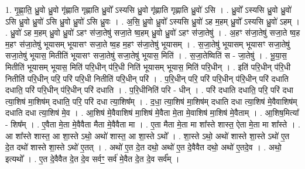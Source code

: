 \documentclass[17pt]{extarticle}
\begin{document}
1. गृ॒ह्णा॒ति॒ ध्रु॒वो ध्रु॒वो गृ॑ह्णाति गृह्णाति ध्रु॒वो᳚ ऽस्यसि ध्रु॒वो गृ॑ह्णाति गृह्णाति ध्रु॒वो॑ ऽसि । . ध्रु॒वो᳚ ऽस्यसि ध्रु॒वो ध्रु॒वो॑ ऽसि ध्रु॒वो ध्रु॒वो॑ ऽसि ध्रु॒वो ध्रु॒वो॑ ऽसि ध्रु॒वः । . अ॒सि॒ ध्रु॒वो ध्रु॒वो᳚ ऽस्यसि ध्रु॒वो॑ ऽह म॒हम् ध्रु॒वो᳚ ऽस्यसि ध्रु॒वो॑ ऽहम् । . ध्रु॒वो॑ ऽह म॒हम् ध्रु॒वो ध्रु॒वो॑ ऽहꣳ स॑जा॒तेषु॑ सजा॒ते ष्व॒हम् ध्रु॒वो ध्रु॒वो॑ ऽहꣳ स॑जा॒तेषु॑ । . अ॒हꣳ स॑जा॒तेषु॑ सजा॒ते ष्व॒ह म॒हꣳ स॑जा॒तेषु॑ भूयासम् भूयासꣳ सजा॒ते ष्व॒ह म॒हꣳ स॑जा॒तेषु॑ भूयासम् । . स॒जा॒तेषु॑ भूयासम् भूयासꣳ सजा॒तेषु॑ सजा॒तेषु॑ भूयास॒ मितीति॑ भूयासꣳ सजा॒तेषु॑ सजा॒तेषु॑ भूयास॒ मिति॑ । . स॒जा॒तेष्विति॑ स - जा॒तेषु॑ । . भू॒या॒स॒ मितीति॑ भूयासम् भूयास॒ मिति॑ परि॒धीन् प॑रि॒धी निति॑ भूयासम् भूयास॒ मिति॑ परि॒धीन् । . इति॑ परि॒धीन् प॑रि॒धी नितीति॑ परि॒धीन् परि॒ परि॑ परि॒धी नितीति॑ परि॒धीन् परि॑ । . प॒रि॒धीन् परि॒ परि॑ परि॒धीन् प॑रि॒धीन् परि॑ दधाति दधाति॒ परि॑ परि॒धीन् प॑रि॒धीन् परि॑ दधाति । . प॒रि॒धीनिति॑ परि - धीन् । . परि॑ दधाति दधाति॒ परि॒ परि॑ दधा त्या॒शिष॑ मा॒शिष॑म् दधाति॒ परि॒ परि॑ दधा त्या॒शिष᳚म् । . द॒धा॒ त्या॒शिष॑ मा॒शिष॑म् दधाति दधा त्या॒शिष॑ मे॒वैवाशिष॑म् दधाति दधा त्या॒शिष॑ मे॒व । . आ॒शिष॑ मे॒वैवाशिष॑ मा॒शिष॑ मे॒वैता मे॒ता मे॒वाशिष॑ मा॒शिष॑ मे॒वैताम् । . आ॒शिष॒मित्या᳚ - शिष᳚म् । . ए॒वैता मे॒ता मे॒वैवैता मैता मे॒वैवैता मा । . ए॒ता मैता मे॒ता मा शा᳚स्ते शास्त॒ ऐता मे॒ता मा शा᳚स्ते । . आ शा᳚स्ते शास्त॒ आ शा॒स्ते ऽथो॒ अथो॑ शास्त॒ आ शा॒स्ते ऽथो᳚ । . शा॒स्ते ऽथो॒ अथो॑ शास्ते शा॒स्ते ऽथो॑ ए॒त दे॒त दथो॑ शास्ते शा॒स्ते ऽथो॑ ए॒तत् । . अथो॑ ए॒त दे॒त दथो॒ अथो॑ ए॒त दे॒वैवैत दथो॒ अथो॑ ए॒तदे॒व । . अथो॒ इत्यथो᳚ । . ए॒त दे॒वैवैत दे॒त दे॒व सर्वꣳ॒॒ सर्व॑ मे॒वैत दे॒त दे॒व सर्व᳚म् । \newline
\end{document}
